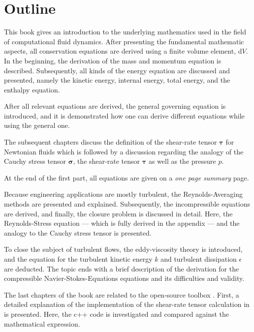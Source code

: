%
%
%
\newpage
%
%
\section*{Outline}
%
%
%
    This book gives an introduction to the underlying mathematics used in the
    field of computational fluid dynamics. After presenting the fundamental mathematic
    aspects, all conservation equations are derived using a finite volume
    element, d$V$. In the beginning, the derivation of the mass and momentum
    equation is described. Subsequently, all kinds of the energy equation are
    discussed and presented, namely the kinetic energy, internal energy, total
    energy, and the enthalpy equation.


    After all relevant equations are derived, the general governing equation is
    introduced, and it is demonstrated how one can derive different equations
    while using the general one.


    The subsequent chapters discuss the definition of the shear-rate tensor
    $\boldsymbol \tau$ for Newtonian fluids which is followed by a discussion
    regarding the analogy of the Cauchy stress tensor $\boldsymbol \sigma$,
    the shear-rate tensor $\boldsymbol \tau$ as well as the pressure $p$.


    At the end of the first part, all equations are given on a
    \textit{one page summary} page.


    Because engineering applications are mostly turbulent, the Reynolds-Averaging
    methods are presented and explained.
    Subsequently, the incompressible 
    equations are derived, and finally, the closure problem is discussed in
    detail. Here, the Reynolds-Stress equation --- which is fully derived in
    the appendix --- and the analogy to the Cauchy stress tensor is presented.


    To close the subject of turbulent flows, the eddy-viscosity theory is
    introduced, and the equation for the turbulent kinetic energy $k$ and
    turbulent dissipation $\epsilon$ are deducted. The topic ends with a
    brief description of the derivation for the compressible
    Navier-Stokes-Equations equations and its difficulties and validity.


    The last chapters of the book are related to the open-source toolbox \OF.
    First, a detailed explanation of the implementation of the shear-rate tensor
    calculation in \OF is presented. Here, the c++ code is investigated and
    compared against the mathematical expression.


